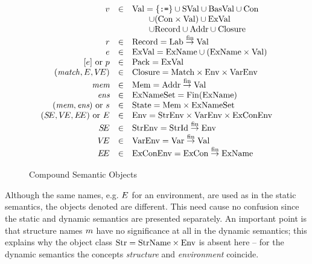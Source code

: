 \begin{figure}[t]
\vspace{2pt}
\begin{displaymath}
\begin{array}{rcl}
        v	&\in	&{\rm Val} =\{\mbox{\tt :=}\}\cup{\rm SVal}\cup{\rm BasVal}\cup{\rm Con}\\
                &       &\qquad\cup({\rm Con}\times{\rm Val})\cup{\rm ExVal}\\
                &       &\qquad\cup{\rm Record}\cup{\rm Addr}\cup{\rm Closure}\\
        r      & \in   & {\rm Record} =  {\rm Lab}\stackrel{{\rm fin}}{\to}{\rm Val}\\
{e}      & \in   & {\rm ExVal} = {\rm ExName} \cup ({\rm ExName}\times{\rm Val})\\
{[e]}\ {\rm or}\ p
                & \in   & {\rm Pack} = {\rm ExVal}\\
({\it match},E,\mbox{$V\!E$}) & \in   & {\rm Closure} = {\rm Match}\times{\rm Env}\times{\rm VarEnv}\\
        \mbox{\it mem}    & \in   & {\rm Mem} = {\rm Addr}\stackrel{{\rm fin}}{\to}{\rm Val}\\
        \mbox{\it ens}   & \in   & {\rm ExNameSet} = \mathop{\rm Fin}\nolimits({\rm ExName})\\
(\mbox{\it mem},\mbox{\it ens})\ {\rm or}\ s
                & \in   & {\rm State} = {\rm Mem}\times{\rm ExNameSet}\\
(\mbox{$S\!E$},\mbox{$V\!E$},\mbox{$E\!E$})\ {\rm or}\ E
                & \in   & {\rm Env} = {\rm StrEnv}\times{\rm VarEnv}\times{\rm ExConEnv}\\
        \mbox{$S\!E$}     & \in   & {\rm StrEnv} = {\rm StrId}\stackrel{{\rm fin}}{\to}{\rm Env}\\
        \mbox{$V\!E$}	& \in	& {\rm VarEnv} = {\rm Var}\stackrel{{\rm fin}}{\to}{\rm Val}\\
        \mbox{$E\!E$}	& \in	& {\rm ExConEnv} = {\rm ExCon}\stackrel{{\rm fin}}{\to}{\rm ExName}\\
\end{array}
\end{displaymath}
\caption{Compound Semantic Objects}
\label{comp-dyn-obj}
\vspace{3pt}
\end{figure}
%
%
Although the same names, e.g. $E$ for an environment, are used
as in the static semantics, the objects denoted are different.  This need cause
no confusion since the static and dynamic semantics are presented %
separately. An important point is that structure names $m$ have
no significance at all in the dynamic semantics; this explains why the
object class ${\rm Str} = {\rm StrName}\times{\rm Env}$ is absent here -- for the dynamic
semantics the concepts {\sl structure} and {\sl environment} coincide.

